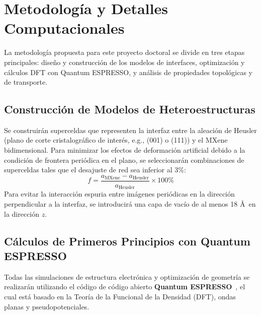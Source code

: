 \section{Metodología y Detalles Computacionales}
\label{sec:metodologia}

La metodología propuesta para este proyecto doctoral se divide en tres etapas principales: diseño y construcción de los modelos de interfaces, optimización y cálculos DFT con Quantum ESPRESSO, y análisis de propiedades topológicas y de transporte.

\subsection{Construcción de Modelos de Heteroestructuras}
Se construirán superceldas que representen la interfaz entre la aleación de Heusler (plano de corte cristalográfico de interés, e.g., (001) o (111)) y el MXene bidimensional. Para minimizar los efectos de deformación artificial debido a la condición de frontera periódica en el plano, se seleccionarán combinaciones de superceldas tales que el desajuste de red sea inferior al 3\%:
\begin{equation}
    f = \frac{a_{\text{MXene}} - a_{\text{Heusler}}}{a_{\text{Heusler}}} \times 100\%
\end{equation}
Para evitar la interacción espuria entre imágenes periódicas en la dirección perpendicular a la interfaz, se introducirá una capa de vacío de al menos 18 \AA\ en la dirección $z$.

\subsection{Cálculos de Primeros Principios con Quantum ESPRESSO}
\label{subsec:qe}
Todas las simulaciones de estructura electrónica y optimización de geometría se realizarán utilizando el código de código abierto \textbf{Quantum ESPRESSO}~\cite{giannozzi2009quantum,giannozzi2017advanced}, el cual está basado en la Teoría de la Funcional de la Densidad (DFT), ondas planas y pseudopotenciales.


